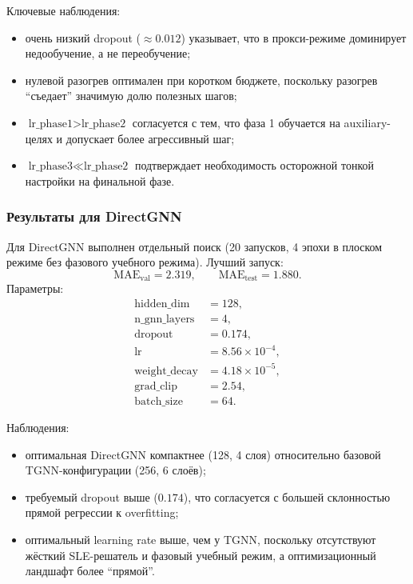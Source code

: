 \documentclass[11pt]{article}
\begin{document}
Ключевые наблюдения:
\begin{itemize}
  \item очень низкий dropout ($\approx 0.012$) указывает, что в прокси-режиме доминирует недообучение, а не переобучение;
  \item нулевой разогрев оптимален при коротком бюджете, поскольку разогрев ``съедает'' значимую долю полезных шагов;
  \item $\text{lr\_phase1} > \text{lr\_phase2}$ согласуется с тем, что фаза 1 обучается на auxiliary-целях и допускает более агрессивный шаг;
  \item $\text{lr\_phase3} \ll \text{lr\_phase2}$ подтверждает необходимость осторожной тонкой настройки на финальной фазе.
\end{itemize}

\subsubsection{Результаты для DirectGNN}

Для DirectGNN выполнен отдельный поиск (20 запусков, 4 эпохи в плоском режиме без фазового учебного режима). Лучший запуск:
\begin{equation*}
\mathrm{MAE}_{\mathrm{val}}=2.319,
\qquad
\mathrm{MAE}_{\mathrm{test}}=1.880.
\end{equation*}
Параметры:
\begin{align*}
\text{hidden\_dim} &= 128, \\
\text{n\_gnn\_layers} &= 4, \\
\text{dropout} &= 0.174, \\
\text{lr} &= 8.56\times10^{-4}, \\
\text{weight\_decay} &= 4.18\times10^{-5}, \\
\text{grad\_clip} &= 2.54, \\
\text{batch\_size} &= 64.
\end{align*}

Наблюдения:
\begin{itemize}
  \item оптимальная DirectGNN компактнее (128, 4 слоя) относительно базовой TGNN-конфигурации (256, 6 слоёв);
  \item требуемый dropout выше ($0.174$), что согласуется с большей склонностью прямой регрессии к overfitting;
  \item оптимальный learning rate выше, чем у TGNN, поскольку отсутствуют жёсткий SLE-решатель и фазовый учебный режим, а оптимизационный ландшафт более ``прямой''.
\end{itemize}
\end{document}

